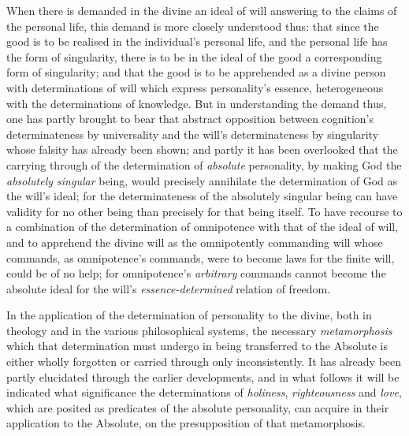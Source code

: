 \documentclass[12pt,a4paper]{book}
\begin{document}
When there is demanded in the divine an ideal of will answering to the claims
of the personal life, this demand is more closely understood thus: that since
the good is to be realised in the individual's personal life, and the personal
life has the form of singularity, there is to be in the ideal of the good a
corresponding form of singularity; and that the good is to be apprehended as a
divine person with determinations of will which express personality's essence,
heterogeneous with the determinations of knowledge. But in understanding the
demand thus, one has partly brought to bear that abstract opposition between
cognition's determinateness by universality and the will's determinateness by
singularity whose falsity has already been shown; and partly it has been
overlooked that the carrying through of the determination of \emph{absolute}
personality, by making God the \emph{absolutely singular} being, would
precisely annihilate the determination of God as the will's ideal; for the
determinateness of the absolutely singular being can have validity for no
other being than precisely for that being itself. To have recourse to a
combination of the determination of omnipotence with that of the ideal of
will, and to apprehend the divine will as the omnipotently commanding will
whose commands, as omnipotence's commands, were to become laws for the finite
will, could be of no help; for omnipotence's \emph{arbitrary} commands cannot
become the absolute ideal for the will's \emph{essence-determined} relation of
freedom.

In the application of the determination of personality to the divine, both in
theology and in the various philosophical
systems, the necessary \emph{metamorphosis} which that determination must
undergo in being transferred to the Absolute is either wholly forgotten or
carried through only inconsistently. It has already been partly elucidated
through the earlier developments, and in what follows it will be indicated
what significance the determinations of \emph{holiness}, \emph{righteousness}
and \emph{love}, which are posited as predicates of the absolute personality,
can acquire in their application to the Absolute, on the presupposition of
that metamorphosis.
\end{document}

